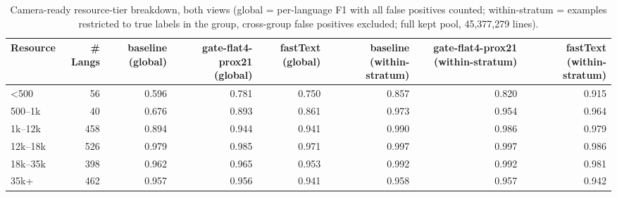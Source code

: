 \begin{table}[htbp]
\centering
\small
\begin{tabular}{lrrrrrrr}
\toprule
\textbf{Resource} & \textbf{# Langs} & \textbf{baseline (global)} & \textbf{gate-flat4-prox21 (global)} & \textbf{fastText (global)} & \textbf{baseline (within-stratum)} & \textbf{gate-flat4-prox21 (within-stratum)} & \textbf{fastText (within-stratum)} \\
\midrule
<500 & 56 & 0.596 & 0.781 & 0.750 & 0.857 & 0.820 & 0.915 \\
500--1k & 40 & 0.676 & 0.893 & 0.861 & 0.973 & 0.954 & 0.964 \\
1k--12k & 458 & 0.894 & 0.944 & 0.941 & 0.990 & 0.986 & 0.979 \\
12k--18k & 526 & 0.979 & 0.985 & 0.971 & 0.997 & 0.997 & 0.986 \\
18k--35k & 398 & 0.962 & 0.965 & 0.953 & 0.992 & 0.992 & 0.981 \\
35k+ & 462 & 0.957 & 0.956 & 0.941 & 0.958 & 0.957 & 0.942 \\
\bottomrule
\end{tabular}
\caption{Camera-ready resource-tier breakdown, both views (global = per-language F1 with all false positives counted; within-stratum = examples restricted to true labels in the group, cross-group false positives excluded; full kept pool, 45,377,279 lines).}
\label{tab:paper_breakdowns_resource}
\end{table}
